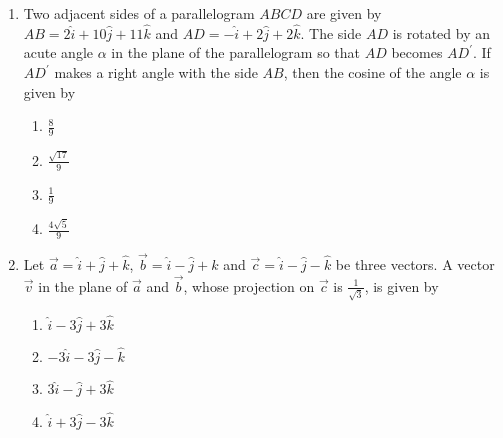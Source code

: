 \begin{enumerate}[label=\thesubsection.\arabic*.,ref=\thesubsection.\theenumi]
\begin{enumerate}
    \end{enumerate}
	\item %
		Two adjacent sides of a parallelogram $ABCD$ are given by $AB = 2\hat{i}+10\hat{j}+11\hat{k}$ and $AD = -\hat{i}+2\hat{j}+2\hat{k}$. 
		The side $AD$ is rotated by an acute angle $\alpha$ in the plane of the parallelogram so that $AD$ becomes $AD^{\prime}$. If $AD^{\prime}$ makes a right angle with the side $AB$, then the cosine of the angle $\alpha$ is given by \hfill{}
    \begin{multicols}{4} 
\begin{enumerate}
	\item $\frac{8}{9}$
	\item $\frac{\sqrt{17}}{9}$
	\item $\frac{1}{9}$
	\item $\frac{4\sqrt{5}}{9}$\\
\end{enumerate}
    \end{multicols}
        \item %
		Let $\vec{a}=\hat{i}+\hat{j}+\hat{k}$, $\vec{b}=\hat{i}-\hat{j}+\hat{k}$ and $\vec{c}=\hat{i}-\hat{j}-\hat{k}$ be three vectors. A vector $\vec{v}$ in the plane of $\vec{a}$ and $\vec{b}$, whose projection on $\vec{c}$ is $\frac{1}{\sqrt{3}}$, is given by \hfill{}
    \begin{multicols}{4} 
\begin{enumerate}
	\item $\hat{i}-3\hat{j}+3\hat{k}$
	\item $-3\hat{i}-3\hat{j}-\hat{k}$
	\item $3\hat{i}-\hat{j}+3\hat{k}$
	\item $\hat{i}+3\hat{j}-3\hat{k}$
\end{enumerate}
    \end{multicols}


\end{enumerate}
